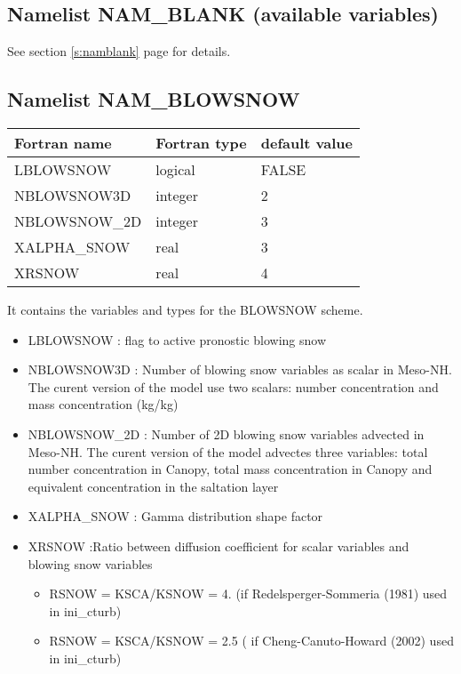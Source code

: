 \subsection{Namelist NAM\_BLANK (available variables)}
See section \ref{s:namblank} page \pageref{s:namblank} for details.

\subsection{Namelist NAM\_BLOWSNOW }

\begin{center}
\begin{tabular} {|l|l|l|}
\hline
Fortran name & Fortran type & default value \\
\hline

LBLOWSNOW    & logical & FALSE     \\
NBLOWSNOW3D  & integer & 2         \\
NBLOWSNOW\_2D& integer & 3       \\
XALPHA\_SNOW & real    &3 \\
XRSNOW       & real    & 4\\
\hline
\end{tabular}
\end{center}
It contains the variables and types for the BLOWSNOW scheme.

\begin{itemize}
\item LBLOWSNOW : flag to active pronostic blowing snow 
\item NBLOWSNOW3D : Number of blowing snow variables as scalar in Meso-NH. The curent version of the model use two scalars:
number concentration and mass concentration (kg/kg)
\item NBLOWSNOW\_2D :  Number of 2D blowing snow variables advected in Meso-NH. The curent version of the model advectes three variables: total number concentration in Canopy, total mass concentration in Canopy and equivalent concentration in the saltation layer

\item XALPHA\_SNOW : Gamma distribution shape factor
\item XRSNOW :Ratio between diffusion coefficient for scalar variables and blowing snow variables
\begin{itemize}
	\item RSNOW = KSCA/KSNOW = 4. (if Redelsperger-Sommeria (1981) used in ini\_cturb)
	\item RSNOW = KSCA/KSNOW = 2.5 ( if Cheng-Canuto-Howard (2002) used in ini\_cturb)
\end{itemize}
\end{itemize}

